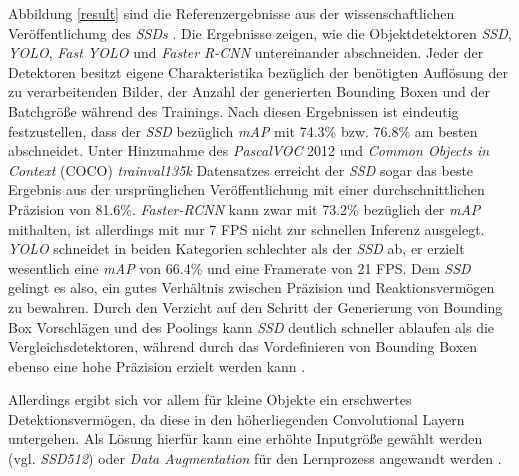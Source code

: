 Abbildung \ref{result} sind die Referenzergebnisse aus der wissenschaftlichen Veröffentlichung des \textit{SSDs} \cite{ssd.20161229}. Die Ergebnisse zeigen, wie die Objektdetektoren \textit{SSD}, \textit{YOLO}, \textit{Fast YOLO} und \textit{Faster R-CNN} untereinander abschneiden. Jeder der Detektoren besitzt eigene Charakteristika bezüglich der benötigten Auflösung der zu verarbeitenden Bilder, der Anzahl der generierten Bounding Boxen und der Batchgröße während des Trainings. Nach diesen Ergebnissen ist eindeutig festzustellen, dass der \textit{SSD} bezüglich \textit{mAP} mit 74.3\% bzw. 76.8\% am besten abschneidet. Unter Hinzunahme des \textit{PascalVOC} 2012 und \textit{Common Objects in Context} (COCO) \textit{trainval135k} Datensatzes erreicht der \textit{SSD} sogar das beste Ergebnis aus der ursprünglichen Veröffentlichung mit einer durchschnittlichen Präzision von 81.6\%. \textit{Faster-RCNN} kann zwar mit 73.2\% bezüglich der \textit{mAP} mithalten, ist allerdings mit nur 7 FPS nicht zur schnellen Inferenz ausgelegt. \textit{YOLO} schneidet in beiden Kategorien schlechter als der \textit{SSD} ab, er erzielt wesentlich eine \textit{mAP} von 66.4\% und eine Framerate von 21 FPS. Dem \textit{SSD} gelingt es also, ein gutes Verhältnis zwischen Präzision und Reaktionsvermögen zu bewahren. Durch den Verzicht auf den Schritt der Generierung von Bounding Box Vorschlägen und des Poolings kann \textit{SSD} deutlich schneller ablaufen als die Vergleichsdetektoren, während durch das Vordefinieren von Bounding Boxen ebenso eine hohe Präzision erzielt werden kann \cite{ssd.20161229}.

Allerdings ergibt sich vor allem für kleine Objekte ein erschwertes Detektionsvermögen, da diese in den höherliegenden Convolutional Layern untergehen. Als Lösung hierfür kann eine erhöhte Inputgröße gewählt werden (vgl. \textit{SSD512}) oder \textit{Data Augmentation} für den Lernprozess angewandt werden \cite{ssd.20161229}.

